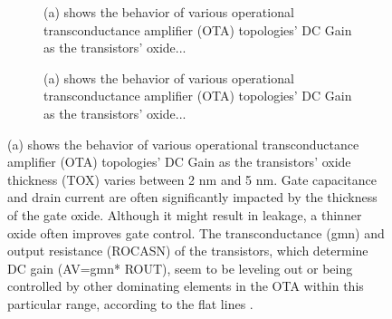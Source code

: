 
\begin{figure}[htbp]
  \centering
  \begin{subfigure}[b]{0.48\linewidth}
    \centering
    \caption{(a) shows the behavior of various operational transconductance amplifier (OTA) topologies' DC Gain as the transistors' oxide...}

  \end{subfigure}
  \hfill
  \begin{subfigure}[b]{0.48\linewidth}
    \centering
    \caption{(a) shows the behavior of various operational transconductance amplifier (OTA) topologies' DC Gain as the transistors' oxide...}

  \end{subfigure}
  \caption{(a) shows the behavior of various operational transconductance amplifier (OTA) topologies' DC Gain as the transistors' oxide thickness (TOX) varies between 2 nm and 5 nm. Gate capacitance and drain current are often significantly impacted by the thickness of the gate oxide. Although it might result in leakage, a thinner oxide often improves gate control. The transconductance (gmn) and output resistance (ROCASN) of the transistors, which determine DC gain (AV=gmn* ROUT), seem to be leveling out or being controlled by other dominating elements in the OTA within this particular range, according to the flat lines \cite{ref7,ref39}.}

  \label{fig:group_y7snq}
\end{figure}
